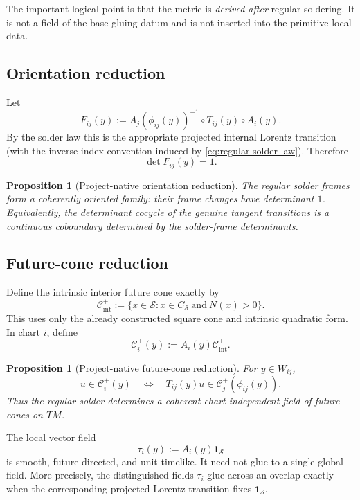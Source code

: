\documentclass[11pt,a4paper]{article}
\newtheorem{proposition}[theorem]{Proposition}
\theoremstyle{definition}
\theoremstyle{remark}
\newcommand{\Smodel}{\mathcal{S}}
\begin{document}
The important logical point is that the metric is \emph{derived after}
regular soldering.  It is not a field of the base-gluing datum and is not
inserted into the primitive local data.

\subsection{Orientation reduction}

Let
\[
   F_{ij}(y)
   :=
   A_j(\phi_{ij}(y))^{-1}
   \circ T_{ij}(y)\circ A_i(y).
\tag{8.3}
\]
By the solder law this is the appropriate projected internal Lorentz
transition (with the inverse-index convention induced by
\eqref{eq:regular-solder-law}).  Therefore
\[
   \det F_{ij}(y)=1.
\tag{8.4}
\]

\begin{proposition}[Project-native orientation reduction]
\label{prop:orientation-reduction}
The regular solder frames form a coherently oriented family: their frame
changes have determinant \(1\).  Equivalently, the determinant cocycle of
the genuine tangent transitions is a continuous coboundary determined by
the solder-frame determinants.
\end{proposition}

\subsection{Future-cone reduction}

Define the intrinsic interior future cone exactly by
\[
   \mathcal C^{+}_{\mathrm{int}}
   :=
   \{x\in\Smodel : x\in C_{\Smodel}\ \text{and}\ N(x)>0\}.
\]
This uses only the already constructed square cone and intrinsic quadratic
form.  In chart \(i\), define
\[
   \mathcal C^{+}_{i}(y)
   :=
   A_i(y)\mathcal C^{+}_{\mathrm{int}}.
\tag{8.5}
\]

\begin{proposition}[Project-native future-cone reduction]
\label{prop:future-cone}
For \(y\in W_{ij}\),
\[
   u\in\mathcal C^{+}_{i}(y)
   \quad\Longleftrightarrow\quad
   T_{ij}(y)u
   \in
   \mathcal C^{+}_{j}(\phi_{ij}(y)).
\tag{8.6}\label{eq:future-cone-transform}
\]
Thus the regular solder determines a coherent chart-independent field of
future cones on \(TM\).
\end{proposition}

The local vector field
\[
   \tau_i(y):=A_i(y)\mathbf1_{\Smodel}
\tag{8.7}
\]
is smooth, future-directed, and unit timelike.  It need not glue to a
single global field.  More precisely, the distinguished fields
\(\tau_i\) glue across an overlap exactly when the corresponding projected
Lorentz transition fixes \(\mathbf1_{\Smodel}\).
\end{document}
